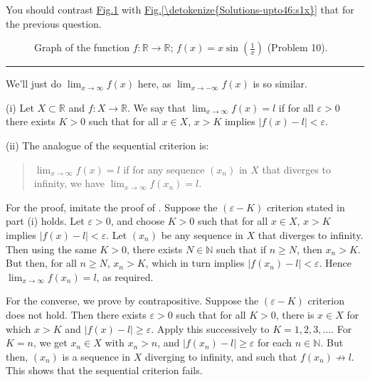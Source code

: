 \documentclass[letterpaper,10pt,english]{jupyterBook}
\let\sphinxpxdimen\pdfpxdimen\else\newdimen\sphinxpxdimen
\begin{document}
You should contrast \hyperref[\detokenize{Solutions-upto46:xs1x}]{Fig.\@ \ref{\detokenize{Solutions-upto46:xs1x}}} with \hyperref[\detokenize{Solutions-upto46:s1x}]{Fig.\@ \ref{\detokenize{Solutions-upto46:s1x}}} that for the previous question.

\begin{figure}[htbp]
\centering
\capstart

\noindent\sphinxincludegraphics[width=700\sphinxpxdimen]{{xsin(1,x)}.png}
\caption{Graph of the function \(f:\mathbb{R}\to\mathbb{R}\); \(f(x)=x\sin\left(\frac{1}{x}\right)\) (Problem 10).}\label{\detokenize{Solutions-upto46:xs1x}}\end{figure}


\bigskip\hrule\bigskip


\sphinxAtStartPar
{\hyperref[\detokenize{Problems:id11}]{}} We’ll just do \(\displaystyle\lim_{x \rightarrow \infty}f(x)\) here, as \(\displaystyle\lim_{x \rightarrow -\infty}f(x)\) is so similar.

\sphinxAtStartPar
(i) Let \(X\subset\mathbb{R}\) and \(f:X\to\mathbb{R}\). We say that \(\lim_{x \rightarrow \infty}f(x) = l\) if for all \(\varepsilon>0\) there exists \(K>0\) such that for all \(x\in X\), \(x>K\) implies \(|f(x)-l|<\varepsilon\).

\sphinxAtStartPar
(ii) The analogue of the sequential criterion is:
\begin{quote}

\sphinxAtStartPar
\(\lim_{x \rightarrow \infty}f(x) = l\) if for any sequence \((x_{n})\) in \(X\) that diverges to infinity, we have \(\lim_{x \rightarrow \infty}f(x_{n}) = l\).
\end{quote}

\sphinxAtStartPar
For the proof,  imitate the proof of . Suppose the \((\varepsilon- K)\) criterion stated in part (i) holds. Let \(\varepsilon>0\), and choose \(K>0\) such that for all \(x\in X\), \(x>K\) implies \(|f(x)-l|<\varepsilon\).  Let \((x_n)\) be any sequence in \(X\) that diverges to infinity. Then using the same \(K>0\), there exists \(N\in\mathbb{N}\) such that if \(n\geq N\), then \(x_{n} > K\).  But then, for all \(n\geq N\), \(x_n>K\), which in turn implies \(|f(x_{n}) - l| < \varepsilon\). Hence \(\lim_{x \rightarrow \infty}f(x_{n}) = l\), as required.

\sphinxAtStartPar
For the converse, we prove by contrapositive. Suppose the \((\varepsilon-K)\) criterion does not hold. Then there exists \(\varepsilon>0\) such that for all \(K>0\), there is \(x\in X\) for which \(x>K\) and \(|f(x)-l|\geq \varepsilon\). Apply this successively to \(K = 1, 2, 3, \ldots\). For \(K=n\), we get \(x_n\in X\) with \(x_{n} > n\), and \(|f(x_{n}) - l| \geq \varepsilon\) for each \(n\in\mathbb{N}\). But then, \((x_n)\) is a sequence in \(X\) diverging to infinity, and such that \(f(x_n)\nrightarrow l\). This shows that the sequential criterion fails.
\end{document}
